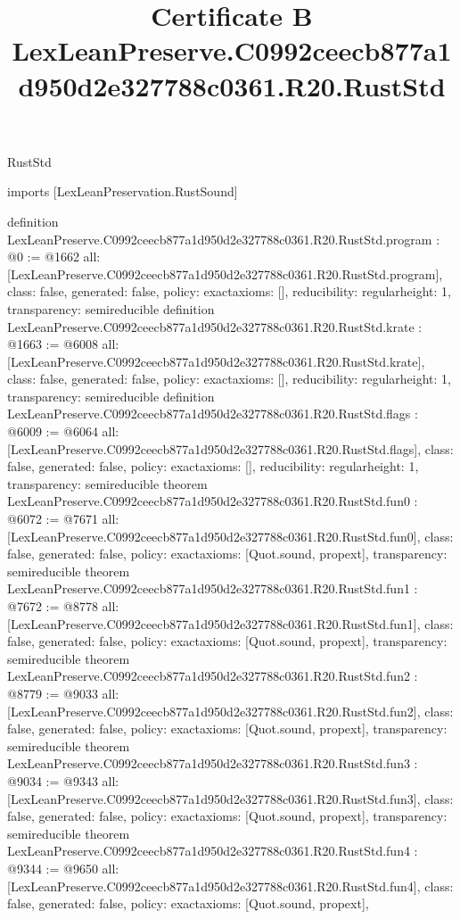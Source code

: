 \begin{lexlean}{RustStd}
\title{Certificate B LexLeanPreserve.C0992ceecb877a1d950d2e327788c0361.R20.RustStd}
\begin{coremodule}
imports [LexLeanPreservation.RustSound]

definition LexLeanPreserve.C0992ceecb877a1d950d2e327788c0361.R20.RustStd.program : @0 := @1662 {
  all: [LexLeanPreserve.C0992ceecb877a1d950d2e327788c0361.R20.RustStd.program],
  class: false,
  generated: false,
  policy: exact{axioms: []},
  reducibility: regular{height: 1},
  transparency: semireducible
}
definition LexLeanPreserve.C0992ceecb877a1d950d2e327788c0361.R20.RustStd.krate : @1663 := @6008 {
  all: [LexLeanPreserve.C0992ceecb877a1d950d2e327788c0361.R20.RustStd.krate],
  class: false,
  generated: false,
  policy: exact{axioms: []},
  reducibility: regular{height: 1},
  transparency: semireducible
}
definition LexLeanPreserve.C0992ceecb877a1d950d2e327788c0361.R20.RustStd.flags : @6009 := @6064 {
  all: [LexLeanPreserve.C0992ceecb877a1d950d2e327788c0361.R20.RustStd.flags],
  class: false,
  generated: false,
  policy: exact{axioms: []},
  reducibility: regular{height: 1},
  transparency: semireducible
}
theorem LexLeanPreserve.C0992ceecb877a1d950d2e327788c0361.R20.RustStd.fun0 : @6072 := @7671 {
  all: [LexLeanPreserve.C0992ceecb877a1d950d2e327788c0361.R20.RustStd.fun0],
  class: false,
  generated: false,
  policy: exact{axioms: [Quot.sound, propext]},
  transparency: semireducible
}
theorem LexLeanPreserve.C0992ceecb877a1d950d2e327788c0361.R20.RustStd.fun1 : @7672 := @8778 {
  all: [LexLeanPreserve.C0992ceecb877a1d950d2e327788c0361.R20.RustStd.fun1],
  class: false,
  generated: false,
  policy: exact{axioms: [Quot.sound, propext]},
  transparency: semireducible
}
theorem LexLeanPreserve.C0992ceecb877a1d950d2e327788c0361.R20.RustStd.fun2 : @8779 := @9033 {
  all: [LexLeanPreserve.C0992ceecb877a1d950d2e327788c0361.R20.RustStd.fun2],
  class: false,
  generated: false,
  policy: exact{axioms: [Quot.sound, propext]},
  transparency: semireducible
}
theorem LexLeanPreserve.C0992ceecb877a1d950d2e327788c0361.R20.RustStd.fun3 : @9034 := @9343 {
  all: [LexLeanPreserve.C0992ceecb877a1d950d2e327788c0361.R20.RustStd.fun3],
  class: false,
  generated: false,
  policy: exact{axioms: [Quot.sound, propext]},
  transparency: semireducible
}
theorem LexLeanPreserve.C0992ceecb877a1d950d2e327788c0361.R20.RustStd.fun4 : @9344 := @9650 {
  all: [LexLeanPreserve.C0992ceecb877a1d950d2e327788c0361.R20.RustStd.fun4],
  class: false,
  generated: false,
  policy: exact{axioms: [Quot.sound, propext]},
}
\end{coremodule}
\end{lexlean}
